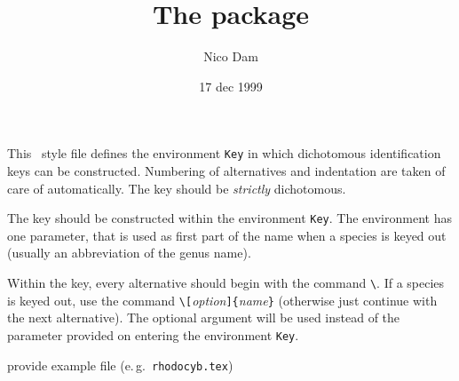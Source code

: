 \documentclass[DIV=8, pagesize=auto]{scrartcl}
\title{The \pkg{dichokey} package}
\author{Nico Dam}
\date{17 dec 1999}
\makeatletter
\newcommand*{\cs}[1]{\texttt{\textbackslash#1}}
\newcommand*{\cmd}[1]{\cs{\expandafter\@gobble\string#1}}
\newcommand*{\env}[1]{\texttt{#1}}
\newcommand*{\meta}[1]{\textlangle\textsl{#1}\textrangle}
\newcommand*{\marg}[1]{\texttt{\{}\meta{#1}\texttt{\}}}
\newcommand*{\oarg}[1]{\texttt{[}\meta{#1}\texttt{]}}
\makeatother
\begin{document}
\maketitle

\noindent
This \LaTeXe\ style file defines the environment \env{Key} in which
dichotomous identification keys can be constructed.
Numbering of alternatives and indentation are taken of care of
automatically.
The key should be \emph{strictly} dichotomous.



The key should be constructed within the environment \env{Key}. The
environment has one parameter, that is used as first part of the name
when a species is keyed out (usually an abbreviation of the genus
name).

Within the key, every alternative should begin with the command \cmd{\alter}.
If a species is keyed out, use the command \cmd{\name}\oarg{option}\marg{name}
(otherwise just continue with the next alternative).
The optional argument will be used instead of the parameter provided
on entering the environment \env{Key}.



provide example file (e.\,g.\ \texttt{rhodocyb.tex})
\end{document}
